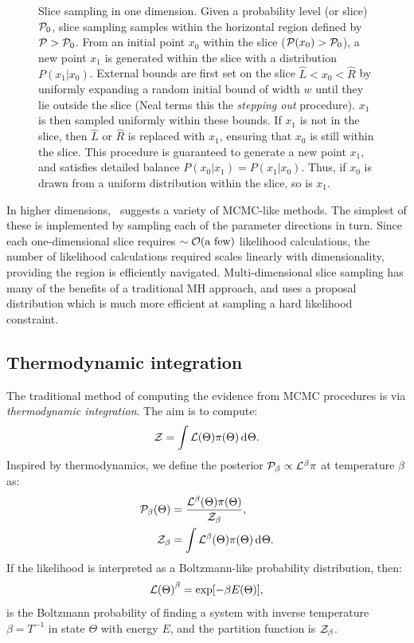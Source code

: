 \begin{figure}[tp]
  \caption{Slice sampling in one dimension. 
    Given a probability level (or slice) \(\mathcal{P}_0\), slice sampling samples within the horizontal region defined by \(\mathcal{P}>\mathcal{P}_0\). 
    From an initial point \(x_0\) within the slice (\(\mathcal{P}(x_0)>\mathcal{P}_0\)), a new point \(x_1\) is generated within the slice with a distribution \(P(x_1|x_0)\).
    External bounds are first set on the slice \(\hat{L}<x_0<\hat{R}\) by uniformly expanding a random initial bound of width \(w\) until they lie outside the slice (Neal terms this the {\em stepping out\/} procedure). 
    \(x_1\) is then sampled uniformly within these bounds.  
    If \(x_1\) is not in the slice, then \(\hat{L}\) or \(\hat{R}\) is replaced with \(x_1\), ensuring that \(x_0\) is still within the slice.
    This procedure is guaranteed to generate a new point \(x_1\), and satisfies detailed balance \(P(x_0|x_1) = P(x_1|x_0)\). Thus, if \(x_0\) is drawn from a uniform distribution within the slice, so is \(x_1\).\label{fig:bay:1d_slice}
  }
\end{figure}



In higher dimensions,~\cite{NealSlice} suggests a variety of MCMC-like methods. The simplest of these is implemented by sampling each of the parameter directions in turn. Since each one-dimensional slice requires \({\sim\mathcal{O}{\left(\text{a few}\right)}}\) likelihood calculations, the number of likelihood calculations required scales linearly with dimensionality, providing the region is efficiently navigated. Multi-dimensional slice sampling has many of the benefits of a traditional MH approach, and uses a proposal distribution which is much more efficient at sampling a hard likelihood constraint.

\subsection{Thermodynamic integration}
The traditional method of computing the evidence from MCMC procedures is via {\em thermodynamic integration}.
The aim is to compute:
\begin{equation}
  \mathcal{Z} = \int \mathcal{L}(\Theta) \pi(\Theta) \operatorname{d}^{}\!{\Theta}.
\end{equation}
Inspired by thermodynamics, we define the posterior \(\mathcal{P}_\beta \propto \mathcal{L}^\beta\pi\) at temperature \(\beta\) as:
\begin{align}
  \mathcal{P}_\beta(\Theta) &= \frac{\mathcal{L}^{\beta}(\Theta) \pi(\Theta)}{\mathcal{Z}_\beta}, 
  \label{eqn:bay:posteriorb}
  \\
  \mathcal{Z}_\beta &= \int\mathcal{L}^{\beta}(\Theta) \pi(\Theta) \operatorname{d}^{}\!{\Theta}.
  \label{eqn:bay:evb}
\end{align}
If the likelihood is interpreted as a Boltzmann-like probability distribution, then:
\begin{equation}
{\mathcal{L}(\Theta)}^\beta = \exp[-\beta E(\Theta)],
\end{equation}
is the Boltzmann probability of finding a system with inverse temperature \(\beta = T^{-1}\) in state \(\Theta\) with energy \(E\), and the partition function is \(\mathcal{Z}_\beta\).

